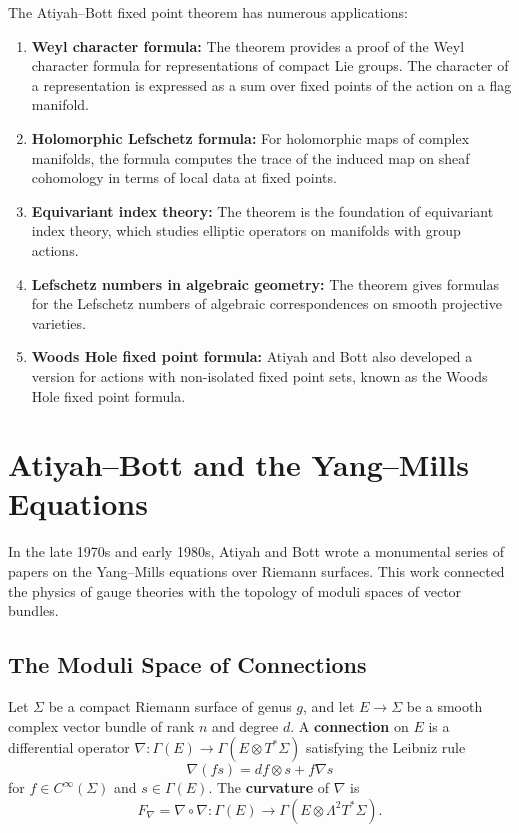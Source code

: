 The Atiyah--Bott fixed point theorem has numerous applications:

\begin{enumerate}
\item \textbf{Weyl character formula:} The theorem provides a proof of the Weyl character formula for representations of compact Lie groups. The character of a representation is expressed as a sum over fixed points of the action on a flag manifold.

\item \textbf{Holomorphic Lefschetz formula:} For holomorphic maps of complex manifolds, the formula computes the trace of the induced map on sheaf cohomology in terms of local data at fixed points.

\item \textbf{Equivariant index theory:} The theorem is the foundation of equivariant index theory, which studies elliptic operators on manifolds with group actions.

\item \textbf{Lefschetz numbers in algebraic geometry:} The theorem gives formulas for the Lefschetz numbers of algebraic correspondences on smooth projective varieties.

\item \textbf{Woods Hole fixed point formula:} Atiyah and Bott also developed a version for actions with non-isolated fixed point sets, known as the Woods Hole fixed point formula.
\end{enumerate}

\section{Atiyah--Bott and the Yang--Mills Equations}

In the late 1970s and early 1980s, Atiyah and Bott wrote a monumental series of papers on the Yang--Mills equations over Riemann surfaces. This work connected the physics of gauge theories with the topology of moduli spaces of vector bundles.

\subsection{The Moduli Space of Connections}

Let \(\Sigma\) be a compact Riemann surface of genus \(g\), and let \(E \to \Sigma\) be a smooth complex vector bundle of rank \(n\) and degree \(d\). A \textbf{connection} on \(E\) is a differential operator \(\nabla: \Gamma(E) \to \Gamma(E \otimes T^*\Sigma)\) satisfying the Leibniz rule
\[
\nabla(f s) = df \otimes s + f \nabla s
\]
for \(f \in C^\infty(\Sigma)\) and \(s \in \Gamma(E)\). The \textbf{curvature} of \(\nabla\) is
\[
F_\nabla = \nabla \circ \nabla: \Gamma(E) \to \Gamma(E \otimes \Lambda^2 T^*\Sigma).
\]

